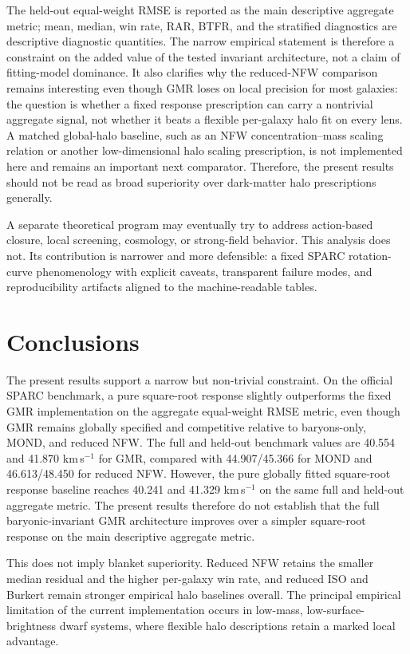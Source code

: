 ﻿\documentclass[twocolumn,linenumbers]{aastex701}
\begin{document}
The held-out equal-weight RMSE is reported as the main descriptive aggregate metric; mean, median, win rate, RAR, BTFR, and the stratified diagnostics are descriptive diagnostic quantities. The narrow empirical statement is therefore a constraint on the added value of the tested invariant architecture, not a claim of fitting-model dominance. It also clarifies why the reduced-NFW comparison remains interesting even though GMR loses on local precision for most galaxies: the question is whether a fixed response prescription can carry a nontrivial aggregate signal, not whether it beats a flexible per-galaxy halo fit on every lens. A matched global-halo baseline, such as an NFW concentration--mass scaling relation or another low-dimensional halo scaling prescription, is not implemented here and remains an important next comparator. Therefore, the present results should not be read as broad superiority over dark-matter halo prescriptions generally.

A separate theoretical program may eventually try to address action-based closure, local screening, cosmology, or strong-field behavior. This analysis does not. Its contribution is narrower and more defensible: a fixed SPARC rotation-curve phenomenology with explicit caveats, transparent failure modes, and reproducibility artifacts aligned to the machine-readable tables.
\section{Conclusions}

The present results support a narrow but non-trivial constraint. On the official SPARC benchmark, a pure square-root response slightly outperforms the fixed GMR implementation on the aggregate equal-weight RMSE metric, even though GMR remains globally specified and competitive relative to baryons-only, MOND, and reduced NFW. The full and held-out benchmark values are 40.554 and 41.870 km\,s$^{-1}$ for GMR, compared with 44.907/45.366 for MOND and 46.613/48.450 for reduced NFW. However, the pure globally fitted square-root response baseline reaches 40.241 and 41.329 km\,s$^{-1}$ on the same full and held-out aggregate metric. The present results therefore do not establish that the full baryonic-invariant GMR architecture improves over a simpler square-root response on the main descriptive aggregate metric.

This does not imply blanket superiority. Reduced NFW retains the smaller median residual and the higher per-galaxy win rate, and reduced ISO and Burkert remain stronger empirical halo baselines overall. The principal empirical limitation of the current implementation occurs in low-mass, low-surface-brightness dwarf systems, where flexible halo descriptions retain a marked local advantage.
\end{document}
